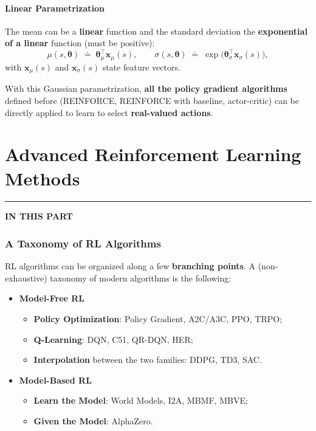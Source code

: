 \documentclass[11pt,a4paper]{article}
\theoremstyle{definition}
\theoremstyle{plain}
\theoremstyle{remark}
\newcommand{\partmtoc}{%
  \vspace{2pt}%
  {\color{rlrule}\rule{\linewidth}{0.5pt}}\par\vspace{3pt}%
  {\footnotesize\bfseries\color{rlaccent}IN THIS PART}\par\vspace{2pt}%
  \begingroup
  \etocsetnexttocdepth{subsection}%
  \localtableofcontents
  \endgroup
  \vspace{2pt}{\color{rlrule}\rule{\linewidth}{0.5pt}}\par\vspace{10pt}}
\begin{document}
\subsection{Linear Parametrization}

The mean can be a \textbf{linear} function and the standard deviation the \textbf{exponential of a linear} function (must be positive):
\[
    \mu(s, \boldsymbol{\theta}) \;\doteq\; \boldsymbol{\theta}_\mu^\top \mathbf{x}_\mu(s), \qquad \sigma(s, \boldsymbol{\theta}) \;\doteq\; \exp\!\bigl(\boldsymbol{\theta}_\sigma^\top \mathbf{x}_\sigma(s)\bigr),
\]
with $\mathbf{x}_\mu(s)$ and $\mathbf{x}_\sigma(s)$ state feature vectors.

\begin{tcolorbox}[colback=blue!5!white, colframe=blue!60!black, title={Take-Away}]
With this Gaussian parametrization, \textbf{all the policy gradient algorithms} defined before (REINFORCE, REINFORCE with baseline, actor-critic) can be directly applied to learn to select \textbf{real-valued actions}.
\end{tcolorbox}

\part{Advanced Reinforcement Learning Methods}
\partmtoc

\section{A Taxonomy of RL Algorithms}

RL algorithms can be organized along a few \textbf{branching points}. A (non-exhaustive) taxonomy of modern algorithms is the following:

\begin{itemize}
    \item \textbf{Model-Free RL}
    \begin{itemize}
        \item \textbf{Policy Optimization}: Policy Gradient, A2C/A3C, PPO, TRPO;
        \item \textbf{Q-Learning}: DQN, C51, QR-DQN, HER;
        \item \textbf{Interpolation} between the two families: DDPG, TD3, SAC.
    \end{itemize}
    \item \textbf{Model-Based RL}
    \begin{itemize}
        \item \textbf{Learn the Model}: World Models, I2A, MBMF, MBVE;
        \item \textbf{Given the Model}: AlphaZero.
    \end{itemize}
\end{itemize}
\end{document}
